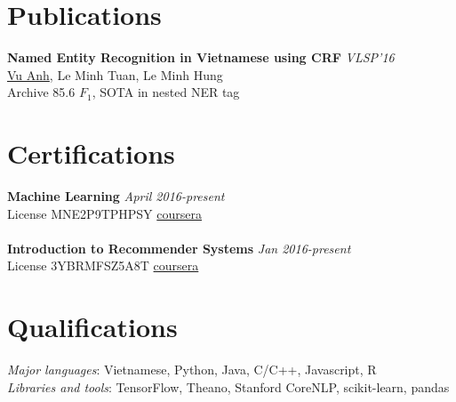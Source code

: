 \documentclass[11pt,a4paper,roman]{article}
\begin{document}
\section{Publications}

\textbf{Named Entity Recognition in Vietnamese using CRF}
\hfill
\textit{VLSP'16} \\
\underline{Vu Anh}, Le Minh Tuan, Le Minh Hung
\\
Archive 85.6 $F_{1}$, SOTA in nested NER tag

\section{Certifications}

\textbf{Machine Learning}
\hfill
\textit{April 2016-present} \\
License MNE2P9TPHPSY
\hfill
\href{https://www.coursera.org/account/accomplishments/verify/MNE2P9TPHPSY}{coursera} 
\\\\
\textbf{Introduction to Recommender Systems}
\hfill
\textit{Jan 2016-present} \\
License 3YBRMFSZ5A8T
\hfill
\href{https://www.coursera.org/account/accomplishments/verify/3YBRMFSZ5A8T}{coursera} 

\section{Qualifications}

\textit{Major languages}: Vietnamese, Python, Java, C/C++, Javascript, R
\\
\textit{Libraries and tools}: TensorFlow, Theano, Stanford CoreNLP, scikit-learn, pandas
\end{document}

